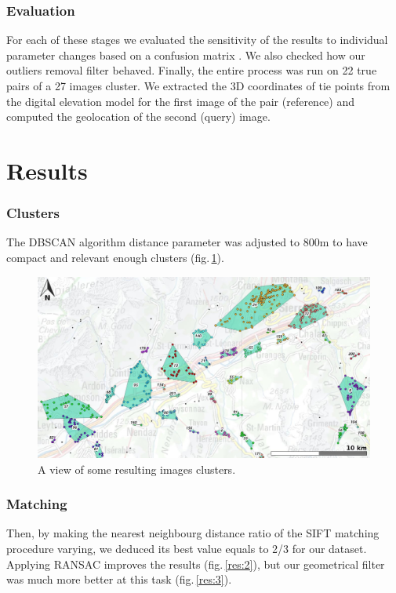 \documentclass[fleqn,10pt]{wlpeerj} %
\begin{document}
\subsubsection*{Evaluation}
For each of these stages we evaluated the sensitivity of the results to individual
parameter changes based on a confusion matrix \citep{stehman1997}.
We also checked how our outliers removal filter behaved.
Finally, the entire process was run on 22 true pairs of a 27 images cluster. 
We extracted the 3D coordinates of tie points from the digital elevation model
for the first image of the pair (reference) and computed the geolocation of 
the second (query) image.



\section*{Results}
\subsubsection*{Clusters}
The DBSCAN algorithm distance parameter was adjusted to 800m to have compact and
relevant enough clusters (fig.\,\ref{clusters}).

\begin{figure}[H]
\centering
\includegraphics[width=0.8\linewidth]{clusters2.jpg}
\caption{A view of some resulting images clusters.}
\label{clusters}
\end{figure}


\subsubsection*{Matching}
Then, by making the nearest neighbourg distance ratio of the SIFT matching 
procedure varying, we deduced its best value equals to 2/3 for our dataset.
Applying RANSAC improves the results (fig.\,\ref{res:2}), but our geometrical 
filter was much more better at this task (fig.\,\ref{res:3}).
\end{document}
